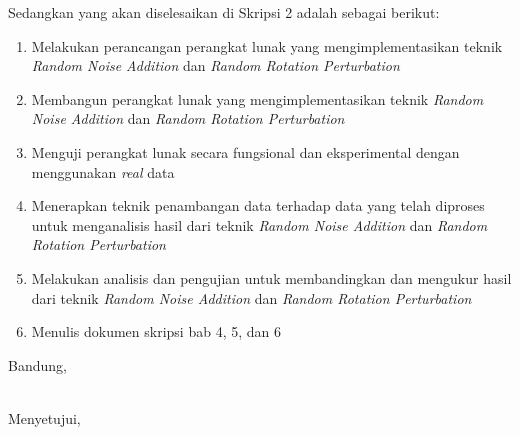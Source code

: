 \documentclass[a4paper,twoside]{article}
\begin{document}
Sedangkan yang akan diselesaikan di Skripsi 2 adalah sebagai berikut:
\begin{enumerate}
	\item Melakukan perancangan perangkat lunak yang mengimplementasikan teknik \textit{Random Noise Addition} dan \textit{Random Rotation Perturbation}
	\item Membangun perangkat lunak yang mengimplementasikan teknik \textit{Random Noise Addition} dan \textit{Random Rotation Perturbation}
	\item Menguji perangkat lunak secara fungsional dan eksperimental dengan menggunakan \textit{real} data
	\item Menerapkan teknik penambangan data terhadap data yang telah diproses untuk menganalisis hasil dari teknik \textit{Random Noise Addition} dan \textit{Random Rotation Perturbation}
	\item Melakukan analisis dan pengujian untuk membandingkan dan mengukur hasil dari teknik \textit{Random Noise Addition} dan \textit{Random Rotation Perturbation}
	\item Menulis dokumen skripsi bab 4, 5, dan 6
\end{enumerate}

\vspace{1cm}
\centering Bandung, \tanggal\\
\vspace{2cm} \nama \\ 
\vspace{1cm}

Menyetujui, \\
\end{document}
